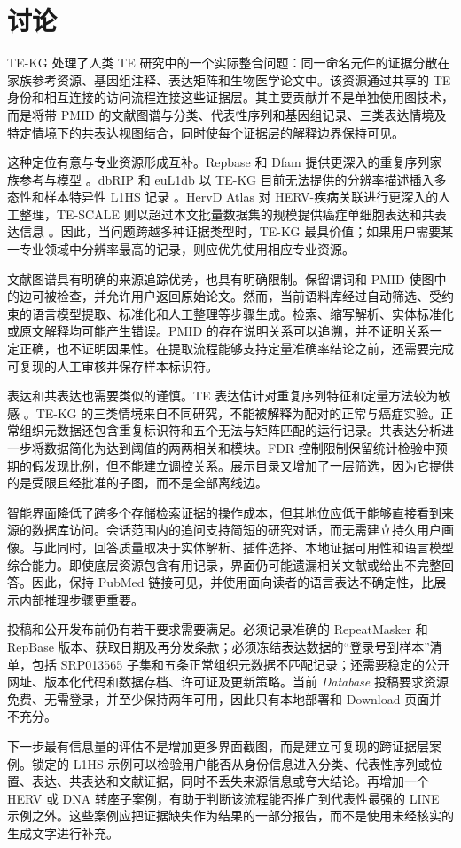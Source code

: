 \section{讨论}

TE-KG 处理了人类 TE 研究中的一个实际整合问题：同一命名元件的证据分散在家族参考资源、基因组注释、表达矩阵和生物医学论文中。该资源通过共享的 TE 身份和相互连接的访问流程连接这些证据层。其主要贡献并不是单独使用图技术，而是将带 PMID 的文献图谱与分类、代表性序列和基因组记录、三类表达情境及特定情境下的共表达视图结合，同时使每个证据层的解释边界保持可见。

这种定位有意与专业资源形成互补。Repbase 和 Dfam 提供更深入的重复序列家族参考与模型 \citep{Bao2015Repbase,Wheeler2013Dfam}。dbRIP 和 euL1db 以 TE-KG 目前无法提供的分辨率描述插入多态性和样本特异性 L1HS 记录 \citep{Wang2006dbRIP,Mir2015euL1db}。HervD Atlas 对 HERV-疾病关联进行更深入的人工整理，TE-SCALE 则以超过本文批量数据集的规模提供癌症单细胞表达和共表达信息 \citep{Li2024HervDAtlas,Meng2026TESCALE}。因此，当问题跨越多种证据类型时，TE-KG 最具价值；如果用户需要某一专业领域中分辨率最高的记录，则应优先使用相应专业资源。

文献图谱具有明确的来源追踪优势，也具有明确限制。保留谓词和 PMID 使图中的边可被检查，并允许用户返回原始论文。然而，当前语料库经过自动筛选、受约束的语言模型提取、标准化和人工整理等步骤生成。检索、缩写解析、实体标准化或原文解释均可能产生错误。PMID 的存在说明关系可以追溯，并不证明关系一定正确，也不证明因果性。在提取流程能够支持定量准确率结论之前，还需要完成可复现的人工审核并保存样本标识符。

表达和共表达也需要类似的谨慎。TE 表达估计对重复序列特征和定量方法较为敏感 \citep{Lanciano2020TEExpression}。TE-KG 的三类情境来自不同研究，不能被解释为配对的正常与癌症实验。正常组织元数据还包含重复标识符和五个无法与矩阵匹配的运行记录。共表达分析进一步将数据简化为达到阈值的两两相关和模块。FDR 控制限制保留统计检验中预期的假发现比例，但不能建立调控关系。展示目录又增加了一层筛选，因为它提供的是受限且经批准的子图，而不是全部离线边。

智能界面降低了跨多个存储检索证据的操作成本，但其地位应低于能够直接看到来源的数据库访问。会话范围内的追问支持简短的研究对话，而无需建立持久用户画像。与此同时，回答质量取决于实体解析、插件选择、本地证据可用性和语言模型综合能力。即使底层资源包含有用记录，界面仍可能遗漏相关文献或给出不完整回答。因此，保持 PubMed 链接可见，并使用面向读者的语言表达不确定性，比展示内部推理步骤更重要。

投稿和公开发布前仍有若干要求需要满足。必须记录准确的 RepeatMasker 和 RepBase 版本、获取日期及再分发条款；必须冻结表达数据的“登录号到样本”清单，包括 SRP013565 子集和五条正常组织元数据不匹配记录；还需要稳定的公开网址、版本化代码和数据存档、许可证及更新策略。当前 \emph{Database} 投稿要求资源免费、无需登录，并至少保持两年可用，因此只有本地部署和 Download 页面并不充分。

下一步最有信息量的评估不是增加更多界面截图，而是建立可复现的跨证据层案例。锁定的 L1HS 示例可以检验用户能否从身份信息进入分类、代表性序列或位置、表达、共表达和文献证据，同时不丢失来源信息或夸大结论。再增加一个 HERV 或 DNA 转座子案例，有助于判断该流程能否推广到代表性最强的 LINE 示例之外。这些案例应把证据缺失作为结果的一部分报告，而不是使用未经核实的生成文字进行补充。
